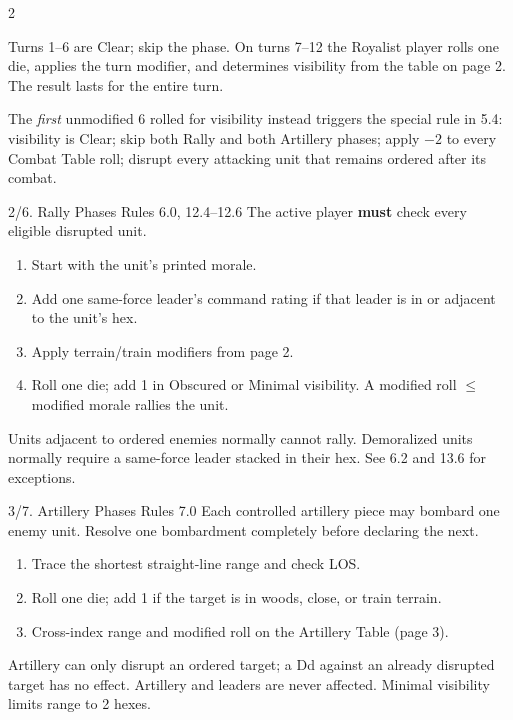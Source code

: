 \begingroup
\fontsize{8.25}{9.35}\selectfont
\begin{multicols}{2}

Turns 1--6 are Clear; skip the phase. On turns 7--12 the Royalist player rolls one die, applies the turn modifier, and determines visibility from the table on page 2. The result lasts for the entire turn.

The \emph{first} unmodified 6 rolled for visibility instead triggers the special rule in 5.4: visibility is Clear; skip both Rally and both Artillery phases; apply $-2$ to every Combat Table roll; disrupt every attacking unit that remains ordered after its combat.

\begin{aidbox}{2/6. Rally Phases \hfill \normalfont\small Rules 6.0, 12.4--12.6}
The active player \textbf{must} check every eligible disrupted unit.
\begin{enumerate}[label=\textbf{\arabic*.}]
  \item Start with the unit's printed morale.
  \item Add one same-force leader's command rating if that leader is in or adjacent to the unit's hex.
  \item Apply terrain/train modifiers from page 2.
  \item Roll one die; add 1 in Obscured or Minimal visibility. A modified roll $\leq$ modified morale rallies the unit.
\end{enumerate}
Units adjacent to ordered enemies normally cannot rally. Demoralized units normally require a same-force leader stacked in their hex. See 6.2 and 13.6 for exceptions.
\end{aidbox}

\begin{aidbox}{3/7. Artillery Phases \hfill \normalfont\small Rules 7.0}
Each controlled artillery piece may bombard one enemy unit. Resolve one bombardment completely before declaring the next.
\begin{enumerate}[label=\textbf{\arabic*.}]
  \item Trace the shortest straight-line range and check LOS.
  \item Roll one die; add 1 if the target is in woods, close, or train terrain.
  \item Cross-index range and modified roll on the Artillery Table (page 3).
\end{enumerate}
Artillery can only disrupt an ordered target; a Dd against an already disrupted target has no effect. Artillery and leaders are never affected. Minimal visibility limits range to 2 hexes.
\end{aidbox}


\end{multicols}
